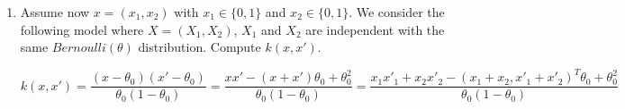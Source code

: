 \documentclass[11pt]{article}
\begin{document}
\begin{enumerate}
\item Assume now $x=(x_1,x_2)$ with $x_1 \in \{0,1\}$ and $x_2 \in \{0,1\}$. 
We consider the following model where $X=(X_1,X_2)$, $X_1$ and $X_2$ are independent with the same $Bernoulli(\theta)$ distribution. 
Compute $k(x,x')$. 

$$k(x,x')=\frac{(x-\theta_0)(x'-\theta_0)}{\theta_0(1-\theta_0)}=\frac{xx'-(x+x')\theta_0+\theta_0^2}{\theta_0(1-\theta_0)}=\frac{x_1x'_1+x_2x'_2-(x_1+x_2,x'_1+x'_2)^T\theta_0+\theta_0^2}{\theta_0(1-\theta_0)}$$



\end{enumerate}
 


 
\end{document}
